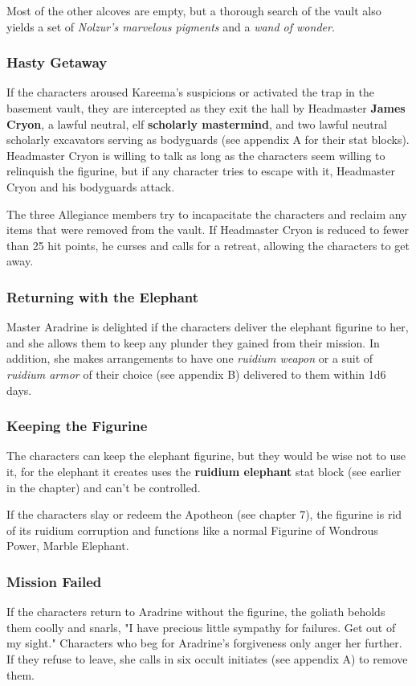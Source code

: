 \documentclass[10pt,a4paper,twoside,fancy,bg=print,twocolumn,openany,nodeprecatedcode]{dndbook}
\begin{document}
Most of the other alcoves are empty, but a thorough search of the vault also yields a set of \textit{Nolzur's marvelous pigments} and a \textit{wand of wonder}.

\subsubsection{Hasty Getaway}
If the characters aroused Kareema's suspicions or activated the trap in the basement vault, they are intercepted as they exit the hall by Headmaster \textbf{James Cryon}, a lawful neutral, elf \textbf{scholarly mastermind}, and two lawful neutral scholarly excavators serving as bodyguards (see appendix A for their stat blocks). Headmaster Cryon is willing to talk as long as the characters seem willing to relinquish the figurine, but if any character tries to escape with it, Headmaster Cryon and his bodyguards attack.

The three Allegiance members try to incapacitate the characters and reclaim any items that were removed from the vault. If Headmaster Cryon is reduced to fewer than 25 hit points, he curses and calls for a retreat, allowing the characters to get away.

\subsubsection{Returning with the Elephant}
Master Aradrine is delighted if the characters deliver the elephant figurine to her, and she allows them to keep any plunder they gained from their mission. In addition, she makes arrangements to have one \textit{ruidium weapon} or a suit of \textit{ruidium armor} of their choice (see appendix B) delivered to them within 1d6 days.

\subsubsection{Keeping the Figurine}
The characters can keep the elephant figurine, but they would be wise not to use it, for the elephant it creates uses the \textbf{ruidium elephant} stat block (see earlier in the chapter) and can't be controlled.

If the characters slay or redeem the Apotheon (see chapter 7), the figurine is rid of its ruidium corruption and functions like a normal Figurine of Wondrous Power, Marble Elephant.

\subsubsection{Mission Failed}
If the characters return to Aradrine without the figurine, the goliath beholds them coolly and snarls, "I have precious little sympathy for failures. Get out of my sight." Characters who beg for Aradrine's forgiveness only anger her further. If they refuse to leave, she calls in six occult initiates (see appendix A) to remove them.
\end{document}
